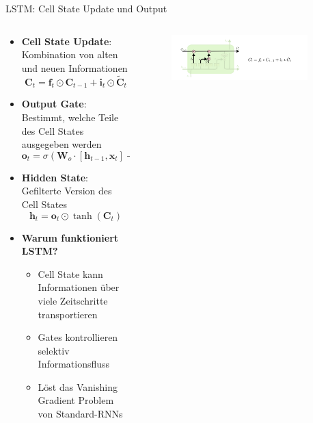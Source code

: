 \documentclass[aspectratio=1610, xcolor=dvipsnames, 9pt]{beamer}
\begin{document}
      \begin{frame}{LSTM: Cell State Update und Output}
        \begin{columns}
          \begin{column}{0.6\textwidth}
            \begin{itemize}
              \item \textbf{Cell State Update}: Kombination von alten und neuen Informationen
              \begin{equation}
                \mathbf{C}_t = \mathbf{f}_t \odot \mathbf{C}_{t-1} + \mathbf{i}_t \odot \tilde{\mathbf{C}}_t
              \end{equation}
              \item \textbf{Output Gate}: Bestimmt, welche Teile des Cell States ausgegeben werden
              \begin{equation}
                \mathbf{o}_t = \sigma(\mathbf{W}_o \cdot [\mathbf{h}_{t-1}, \mathbf{x}_t] + \mathbf{b}_o)
              \end{equation}
              \item \textbf{Hidden State}: Gefilterte Version des Cell States
              \begin{equation}
                \mathbf{h}_t = \mathbf{o}_t \odot \tanh(\mathbf{C}_t)
              \end{equation}
              \item \textbf{Warum funktioniert LSTM?}
              \begin{itemize}
                \item Cell State kann Informationen über viele Zeitschritte transportieren
                \item Gates kontrollieren selektiv Informationsfluss
                \item Löst das Vanishing Gradient Problem von Standard-RNNs
              \end{itemize}
            \end{itemize}
          \end{column}
           \begin{column}{0.4\textwidth}
               \begin{figure}
                \centering
                            \includegraphics[width=0.9\textwidth]{images/LSTM_5.png}

\end{figure}
\end{column}
\end{columns}
\end{frame}
\end{document}
